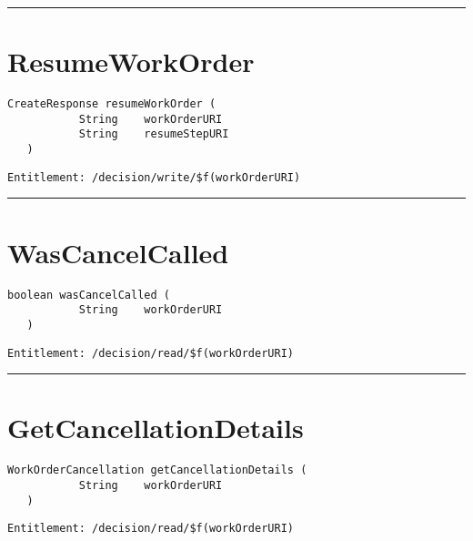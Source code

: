 \rule{12cm}{2pt}
\section{ResumeWorkOrder}
\label{Api:ResumeWorkOrder}
\begin{lstlisting}[style=nonumbers]
   CreateResponse resumeWorkOrder (
           String    workOrderURI
           String    resumeStepURI
   )
\end{lstlisting}
\begin{Verbatim}[formatcom=\color{Maroon}]
  Entitlement: /decision/write/$f(workOrderURI)
\end{Verbatim}



\rule{12cm}{2pt}
\section{WasCancelCalled}
\label{Api:WasCancelCalled}
\begin{lstlisting}[style=nonumbers]
   boolean wasCancelCalled (
           String    workOrderURI
   )
\end{lstlisting}
\begin{Verbatim}[formatcom=\color{Maroon}]
  Entitlement: /decision/read/$f(workOrderURI)
\end{Verbatim}



\rule{12cm}{2pt}
\section{GetCancellationDetails}
\label{Api:GetCancellationDetails}
\begin{lstlisting}[style=nonumbers]
   WorkOrderCancellation getCancellationDetails (
           String    workOrderURI
   )
\end{lstlisting}
\begin{Verbatim}[formatcom=\color{Maroon}]
  Entitlement: /decision/read/$f(workOrderURI)
\end{Verbatim}



